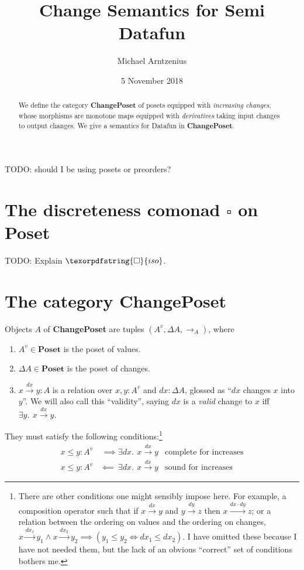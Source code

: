 \documentclass[nomarginums]{rntz}
\title{Change Semantics for Semi\naive{} Datafun}
\author{Michael Arntzenius}
\date{5 November 2018}
\newcommand\todo[1]{{\color{Rhodamine}#1}}
\newcommand\cat\textbf
\newcommand\CP{\cat{ChangePoset}}
\newcommand\Poset{\cat{Poset}}
\newcommand\D\Delta
\newcommand\iso{\texorpdfstring{\ensuremath{\square}}{iso}}
\newcommand\validarrow{{\to}}
\newcommand\longvalidarrow{{\longrightarrow}}
\newcommand\valid[1]{\mathrel{\overset{#1}{\validarrow}}}
\newcommand\longvalid[1]{\mathrel{\overset{#1}{\longvalidarrow}}}
\newcommand\vals[1]{#1^v} %
\newcommand\chgs[1]{\D{#1}}
\newcommand\bindsp{~\,}
\newcommand\ex[1]{\exists #1.\bindsp}
\begin{document}
\maketitle

\begin{abstract}
  We define the category \CP{} of posets equipped with \emph{increasing
    changes}, whose morphisms are monotone maps equipped with \emph{derivatives}
  taking input changes to output changes. We give a semantics for Datafun in
  \CP.
\end{abstract}

\todo{TODO: should I be using posets or preorders?}


\section{The discreteness comonad \iso{} on \Poset{}}
\todo{TODO: Explain $\iso$.}


\section{The category \CP}

Objects $A$ of \CP{} are tuples $(\vals A, \chgs A, \validarrow_A)$, where
\begin{enumerate}
\item $\vals A \in \Poset$ is the poset of values.
\item $\chgs A \in \Poset$ is the poset of changes.
\item $x \valid{dx} y : A$ is a relation over $x,y : \vals A$ and $dx : \chgs
  A$, glossed as ``$dx$ changes $x$ into $y$''. We will also call this
  ``validity'', saying $dx$ is a \emph{valid} change to $x$ iff $\ex{y} x
  \valid{dx} y$.
\end{enumerate}

\noindent They must satisfy the following conditions:\footnote{There are other
  conditions one might sensibly impose here. For example, a composition operator
  such that if $x \valid{dx} y$ and $y \valid{dy} z$ then $x \longvalid{dx
    \cdot dy} z$; or a relation between the ordering on values and the ordering
  on changes, \(x \valid{dx_1} y_1 \wedge x \valid{dx_2} y_2 \implies (y_1 \le
  y_2 \iff dx_1 \le dx_2)\). I have omitted these because I have not needed
  them, but the lack of an obvious ``correct'' set of conditions bothers me.}
\begin{align*}
  x \le y : \vals A &~\implies \ex{dx} x \valid{dx} y
  & \text{complete for increases}
  \\
  x \le y : \vals A &\impliedby~ \ex{dx} x \valid{dx} y
  & \text{sound for increases}
\end{align*}
\end{document}
